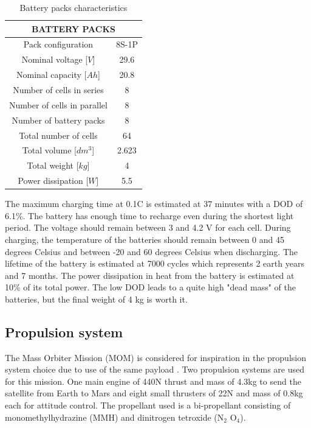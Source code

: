 \documentclass[a4paper, oneside, 11pt]{article}
\begin{document}
\begin{table}[h]
 \caption{Battery packs characteristics}
 \label{Battery_pack}
\centering
 \begin{tabular}{| c | c |}
  \hline
	\multicolumn{2}{|c|}{\textbf{BATTERY PACKS}}     \\
  \hline
  	Pack configuration		& 8S-1P \\
    Nominal voltage [$V$]   & 29.6  \\
    Nominal capacity [$Ah$] & 20.8 \\
    Number of cells in series           & 8 \\
    Number of cells in parallel & 8 \\
    Number of battery packs & 8 \\
    Total number of cells & 64 \\
    Total volume [$dm^{3}$]       & 2.623 \\
    Total weight [$kg$]         & 4 \\
    Power dissipation [$W$]     & 5.5 \\
  \hline
\end{tabular}
\end{table}


The maximum charging time at 0.1C is estimated at 37 minutes with a DOD of 6.1\%. The battery has enough time to recharge even during the shortest light period. The voltage should remain between 3 and 4.2 V for each cell. During charging, the temperature of the batteries should remain between 0 and 45 degrees Celsius and between -20 and 60 degrees Celsius when discharging. The lifetime of the battery is estimated at 7000 cycles which represents 2 earth years and 7 months. The power dissipation in heat from the battery is estimated at 10\% of its total power. The low DOD leads to a quite high "dead mass" of the batteries, but the final weight of 4 kg is worth it.

\subsection{Propulsion system}
The Mass Orbiter Mission (MOM) is considered for inspiration in the propulsion system choice due to use of the same payload \cite{MOM}. Two propulsion systems are used for this mission. One main engine of 440N thrust and mass of 4.3kg to send the satellite from Earth to Mars and eight small thrusters of 22N and mass of 0.8kg each for attitude control. The propellant used is a bi-propellant consisting of monomethylhydrazine (MMH) and dinitrogen tetroxide (N$_{2}$ O$_{4}$). 
\end{document}
